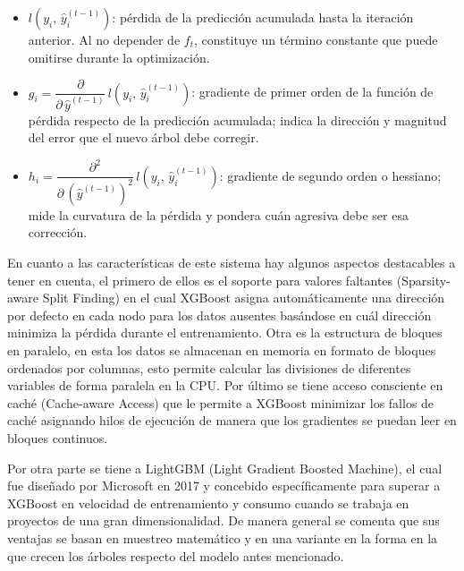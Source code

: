 \begin{itemize}
  \item $l\left(y_i,\, \hat{y}_i^{(t-1)}\right)$: pérdida de la predicción acumulada hasta la iteración anterior. Al no depender de $f_t$, constituye un término constante que puede omitirse durante la optimización.
  \item $g_i = \dfrac{\partial}{\partial\, \hat{y}^{(t-1)}}\, l\left(y_i,\, \hat{y}_i^{(t-1)}\right)$: gradiente de primer orden de la función de pérdida respecto de la predicción acumulada; indica la dirección y magnitud del error que el nuevo árbol debe corregir.
  \item $h_i = \dfrac{\partial^{2}}{\partial\, \left(\hat{y}^{(t-1)}\right)^{2}}\, l\left(y_i,\, \hat{y}_i^{(t-1)}\right)$: gradiente de segundo orden o hessiano; mide la curvatura de la pérdida y pondera cuán agresiva debe ser esa corrección.
\end{itemize}

En cuanto a las características de este sistema hay algunos aspectos destacables a tener en cuenta, el primero de ellos es el soporte para valores faltantes (Sparsity-aware Split Finding) en el cual XGBoost asigna automáticamente una dirección por defecto en cada nodo para los datos ausentes basándose en cuál dirección minimiza la pérdida durante el entrenamiento. Otra es la estructura de bloques en paralelo, en esta los datos se almacenan en memoria en formato de bloques ordenados por columnas, esto permite calcular las divisiones de diferentes variables de forma paralela en la CPU. Por último se tiene acceso consciente en caché (Cache-aware Access) que le permite a XGBoost minimizar los fallos de caché asignando hilos de ejecución de manera que los gradientes se puedan leer en bloques continuos.

Por otra parte se tiene a LightGBM (Light Gradient Boosted Machine), el cual fue diseñado por Microsoft en 2017 y concebido específicamente para superar a XGBoost en velocidad de entrenamiento y consumo cuando se trabaja en proyectos de una gran dimensionalidad. De manera general se comenta que sus ventajas se basan en muestreo matemático y en una variante en la forma en la que crecen los árboles respecto del modelo antes mencionado.

